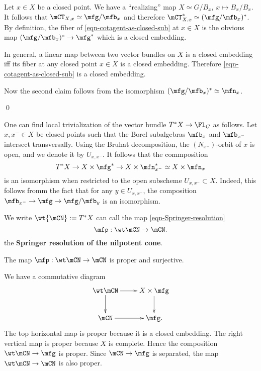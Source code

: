 	\proof
		Let $x\in X$ be a closed point. We have a ``realizing'' map $X\simeq G/B_x$, $x\mapsto B_x/B_x$. It follows that $\mCT_{X,x}\simeq \mfg/\mfb_x $ and therefore $\mCT^*_{X,x}\simeq (\mfg/\mfb_x)^* $. By definition, the fiber of \eqref{eqn-cotagent-as-closed-sub} at $x\in X$ is the obvious map $(\mfg/\mfb_x )^* \to \mfg^*$ which is a closed embedding.

		In general, a linear map between two vector bundles on $X$ is a closed embedding iff its fiber at any closed point $x\in X$ is a closed embedding. Therefore \eqref{eqn-cotagent-as-closed-sub} is a closed embedding.

		Now the second claim follows from the isomorphism $(\mfg/\mfb_x)^*\simeq \mfn_x$.

	\qed

	\begin{rem}
		\label{rem-Springer-coordinate}
		One can find local trivialization of the vector bundle $T^*X \to \Fl_G$ as follows. Let $x,x^- \in X$ be closed points such that the Borel subalgebras $\mfb_x$ and $\mfb_{x^-}$ intersect transversally. Using the Bruhat decomposition, the $(N_{x^-})$-orbit of $x$ is open, and we denote it by $U_{x,x^-}$. It follows that the commposition
		\[
			T^* X \to X\mt \mfg^* \to X \mt \mfn_{x^-}^* \simeq X \mt \mfn_x
		\]
		is an isomorphism when restricted to the open subscheme $U_{x,x^-}\subset X$. Indeed, this follows fromm the fact that for any $y\in U_{x,x^-}$, the composition $\mfb_{x^-} \to \mfg \to \mfg/\mfb_y$ is an isomorphism.
	\end{rem}

	\begin{defn}
		We write $\wt{\mCN}:=T^* X $ can call the map \eqref{eqn-Springer-resolution}
		\[
			\mfp: \wt\mCN \to \mCN.
		\]	
		the \textbf{Springer resolution of the nilpotent cone}.
	\end{defn}

	\begin{lem}
		\label{lem-Springer-proper-surj}
		The map $\mfp:\wt\mCN \to \mCN$ is proper and surjective.
	\end{lem}

	\proof
		We have a commutative diagram
		\[
			\xymatrix{
				\wt\mCN \ar[r]\ar[d] & X\mt \mfg \ar[d] \\
				\mCN \ar[r] & \mfg.
			}
		\]
		The top horizontal map is proper because it is a closed embedding. The right vertical map is proper because $X$ is complete. Hence the composition $\wt\mCN\to \mfg$ is proper. Since $\mCN \to \mfg$ is separated, the map $\wt\mCN \to \mCN$ is also proper.

